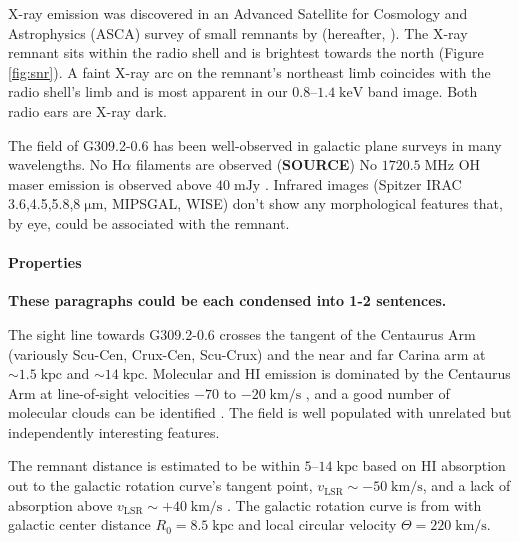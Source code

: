 \documentclass[preprint2,tighten,trackchanges]{aastex6}
\newcommand*{\mt}{\mathrm}
\newcommand*{\unit}[1]{\;\mt{#1}}  %
\newcommand*{\abt}{\mathord{\sim}} %
\begin{document}
X-ray emission was discovered in an Advanced Satellite for Cosmology and
Astrophysics (ASCA) survey of small remnants by \citet{rakowski2001}
(hereafter, ).
The X-ray remnant sits within the radio shell and is brightest towards the
north (Figure \ref{fig:snr}).
A faint X-ray arc on the remnant's northeast limb coincides with the radio
shell's limb and is most apparent in our $0.8$--$1.4 \unit{keV}$ band image.
Both radio ears are X-ray dark.

The field of G309.2-0.6 has been well-observed in galactic plane surveys in
many wavelengths.
No H$\alpha$ filaments are observed (\textbf{SOURCE}) %
No $1720.5 \unit{MHz}$ OH maser emission is observed above $40 \unit{mJy}$
\citep{green1997}.
Infrared images (Spitzer IRAC 3.6,4.5,5.8,$8 \unit{{\mu}m}$, MIPSGAL, WISE)
don't show any morphological features that, by eye, could be associated with
the remnant.

\paragraph{Properties}

\textbf{These paragraphs could be each condensed into 1-2 sentences.}

The sight line towards G309.2-0.6 crosses the tangent of the Centaurus Arm
(variously Scu-Cen, Crux-Cen, Scu-Crux) and the near and far Carina arm at
$\abt 1.5 \unit{kpc}$ and $\abt 14 \unit{kpc}$.  Molecular and HI emission is
dominated by the Centaurus Arm at line-of-sight velocities $-70$ to
$-20 \unit{km/s}$ \citep[e.g.,][Figure 4]{dame2011}, and a good number of
molecular clouds can be identified \citep{rice2016}.  The field is well
populated with unrelated but independently interesting features.

The remnant distance is estimated to be within $5$--$14 \unit{kpc}$ based on HI
absorption out to the galactic rotation curve's tangent point, $v_{\mt{LSR}}
\sim -50 \unit{km/s}$, and a lack of absorption above $v_{\mt{LSR}} \sim +40
\unit{km/s}$ .  The galactic rotation curve is from
\citet{fich1989} with galactic center distance $R_0 = 8.5 \unit{kpc}$ and local
circular velocity $\Theta = 220 \unit{km/s}$.
\end{document}
